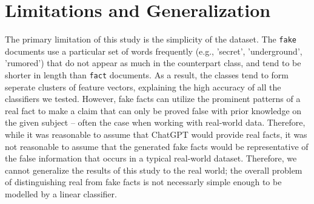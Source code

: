 \documentclass[11pt]{article}
\begin{document}
\section{Limitations and Generalization}
The primary limitation of this study is the simplicity of the dataset.
The \texttt{fake} documents use a particular set of words 
frequently (e.g., 'secret', 'underground', 'rumored')
that do not appear as much in the counterpart class, and
tend to be shorter in length than \texttt{fact} documents.
As a result, the classes tend to form seperate clusters of feature vectors,
explaining the high accuracy of all the classifiers we tested. However,
fake facts can utilize the prominent patterns
of a real fact to make a claim that can only be proved 
false with prior knowledge on the given subject – often the case when working with real-world data.
Therefore, while it was reasonable to assume that ChatGPT would provide real facts,
it was not reasonable to assume that the generated 
fake facts would be representative of the false
information that occurs in a typical real-world dataset. 
Therefore, we cannot generalize the results of this
study to the real world; 
the overall problem of distinguishing real from fake
facts is not necessarly simple enough to be modelled by
a linear classifier.
\end{document}
